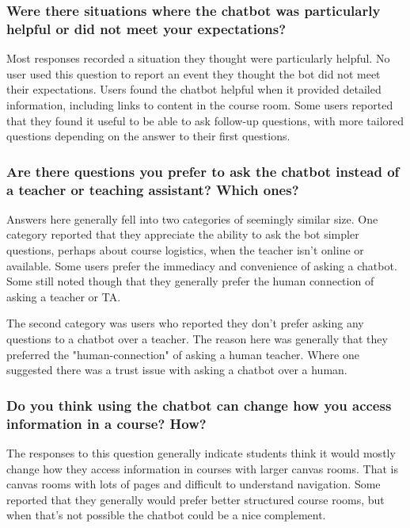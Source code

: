 \subsubsection{Were there situations where the chatbot was particularly helpful or did not meet your expectations?}


Most responses recorded a situation they thought were particularly helpful. No user used this question to report an event they thought the bot did not meet their expectations. Users found the chatbot helpful when it provided detailed information, including links to content in the course room. Some users reported that they found it useful to be able to ask follow-up questions, with more tailored questions depending on the answer to their first questions.


\subsubsection{Are there questions you prefer to ask the chatbot instead of a teacher or teaching assistant? Which ones?}


Answers here generally fell into two categories of seemingly similar size. One category reported that they appreciate the ability to ask the bot simpler questions, perhaps about course logistics, when the teacher isn’t online or available. Some users prefer the immediacy and convenience of asking a chatbot. Some still noted though that they generally prefer the human connection of asking a teacher or TA.


The second category was users who reported they don’t prefer asking any questions to a chatbot over a teacher. The reason here was generally that they preferred the "human-connection" of asking a human teacher. Where one suggested there was a trust issue with asking a chatbot over a human.


\subsubsection{Do you think using the chatbot can change how you access information in a course? How?}


The responses to this question generally indicate students think it would mostly change how they access information in courses with larger canvas rooms. That is canvas rooms with lots of pages and difficult to understand navigation. Some reported that they generally would prefer better structured course rooms, but when that’s not possible the chatbot could be a nice complement.


